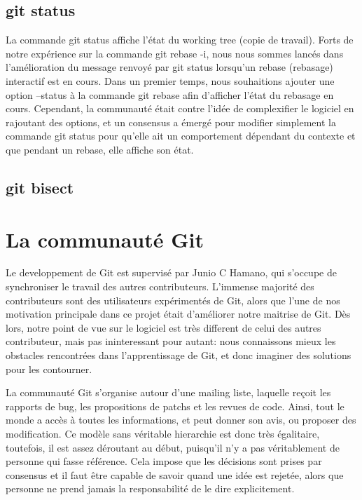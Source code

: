 \documentclass[a4paper, 12pt]{article}
\begin{document}
\subsection{git status}

La commande git status affiche l'état du working tree (copie de travail).
Forts de notre expérience sur la commande git rebase -i, nous nous sommes lancés dans l'amélioration du message renvoyé par git status lorsqu'un rebase (rebasage) interactif est en cours.
Dans un premier temps, nous souhaitions ajouter une option --status à la commande git rebase afin d'afficher l'état du rebasage en cours. 
Cependant, la communauté était contre l'idée de complexifier le logiciel en rajoutant des options, et un consensus a émergé pour modifier simplement la commande git status pour qu'elle ait un comportement dépendant du contexte et que pendant un rebase, elle affiche son état.




\subsection{git bisect}



\section{La communauté Git}

Le developpement de Git est supervisé par Junio C Hamano, qui s'occupe de synchroniser le travail des autres contributeurs.
L'immense majorité des contributeurs sont des utilisateurs expérimentés de Git, alors que l'une de nos motivation principale dans ce projet était d'améliorer notre maitrise de Git.
Dès lors, notre point de vue sur le logiciel est très different de celui des autres contributeur, mais pas ininteressant pour autant: nous connaissons mieux les obstacles rencontrées dans l'apprentissage de Git, et donc imaginer des solutions pour les contourner.

La communauté Git s'organise autour d'une mailing liste, laquelle reçoit les rapports de bug, les propositions de patchs et les revues de code. Ainsi, tout le monde a accès à toutes les informations, et peut donner son avis, ou proposer des modification.
Ce modèle sans véritable hierarchie est donc très égalitaire, toutefois, il est assez déroutant au début, puisqu'il n'y a pas véritablement de personne qui fasse référence.
Cela impose que les décisions sont prises par consensus et il faut être capable de savoir quand une idée est rejetée, alors que personne ne prend jamais la responsabilité de le dire explicitement.
\end{document}
